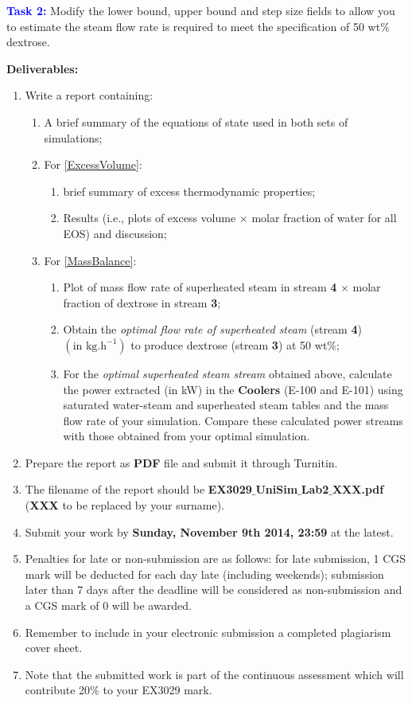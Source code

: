 \documentclass[12pts,a4paper,amsmath,amssymb,floatfix]{article}%
\begin{document}
\begin{enumerate}[label=\bfseries Problem \arabic*]
{\bf \textcolor{blue}{Task 2:}} Modify the lower bound, upper bound and step size fields to allow you to estimate the steam flow rate is required to meet the specification of 50 wt$\%$ dextrose.
%
\end{enumerate}
\clearpage

{\bf {\large Deliverables:}}
\begin{enumerate}
%
\item Write a report containing:
\begin{enumerate}
\item A brief summary of the equations of state used in both sets of simulations;
\item For \ref{ExcessVolume}: 
\begin{enumerate}
\item brief summary of excess thermodynamic properties;
\item Results (i.e., plots of excess volume $\times$ molar fraction of water for all EOS) and discussion;
\end{enumerate}
\item For \ref{MassBalance}: 
\begin{enumerate}
\item Plot of mass flow rate of superheated steam in stream {\bf 4} $\times$ molar fraction of dextrose in stream {\bf 3};
\item\label{optimal} Obtain the {\it optimal flow rate of superheated steam} (stream {\bf 4}) $\left(\text{in kg.h}^{-1}\right)$ to produce dextrose (stream {\bf 3}) at 50 wt$\%$;
\item For the {\it optimal superheated steam stream} obtained above, calculate the power extracted (in kW) in the {\bf Coolers} (E-100 and E-101) using saturated water-steam and superheated steam tables and the mass flow rate of your simulation. Compare these calculated power streams with those obtained from your optimal simulation. 
\end{enumerate}
\end{enumerate}
%
\item Prepare the report as {\bf PDF} file and submit it through Turnitin.  
%
\item The filename of the report should be {\bf EX3029$\_$UniSim$\_$Lab2$\_$XXX.pdf} ({\bf XXX} to be replaced by your surname). 
%
\item Submit your work by {\bf Sunday, November 9th 2014, 23:59} at the latest. 
%
\item Penalties for late or non-submission are as follows: for late submission, 1 CGS mark will be deducted for each day late (including weekends); submission later than 7 days after the deadline will be considered as non-submission and a CGS mark of 0 will be awarded. 
%
\item Remember to include in your electronic submission a completed plagiarism cover sheet. 
%
\item Note that the submitted work is part of the continuous assessment which will contribute 20$\%$ to your EX3029 mark.
%
\end{enumerate}



\clearpage

%
\end{document}
